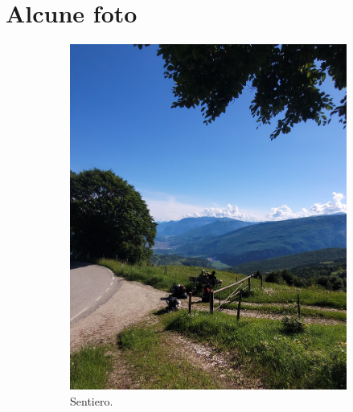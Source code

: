\documentclass{article}
\begin{document}
\section{Alcune foto}

\begin{figure}[htbp!]
    \centering
    \begin{subfigure}{0.45\textwidth}
        \centering
        \includegraphics[width=\linewidth]{images/foto_panchina.jpg}
        \caption{Sentiero.}
        \label{fig:foto1}
    \end{subfigure}
    \hfill 
    \begin{subfigure}{0.45\textwidth}
        \centering

\end{subfigure}
\end{figure}
\end{document}
